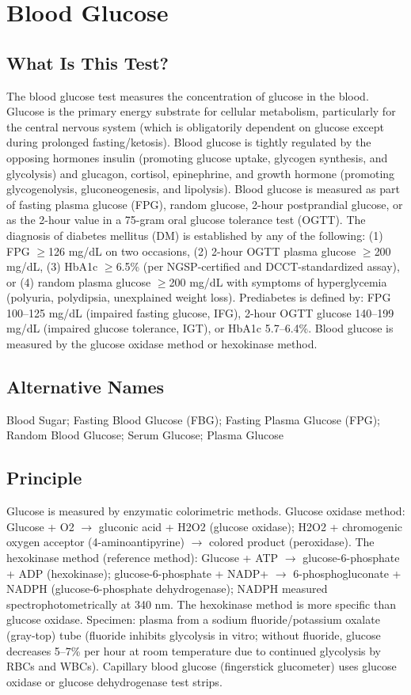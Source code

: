\chapter{Blood Glucose}
\section*{What Is This Test?}
The blood glucose test measures the concentration of glucose in the blood. Glucose is the primary energy substrate for cellular metabolism, particularly for the central nervous system (which is obligatorily dependent on glucose except during prolonged fasting/ketosis). Blood glucose is tightly regulated by the opposing hormones insulin (promoting glucose uptake, glycogen synthesis, and glycolysis) and glucagon, cortisol, epinephrine, and growth hormone (promoting glycogenolysis, gluconeogenesis, and lipolysis). Blood glucose is measured as part of fasting plasma glucose (FPG), random glucose, 2-hour postprandial glucose, or as the 2-hour value in a 75-gram oral glucose tolerance test (OGTT). The diagnosis of diabetes mellitus (DM) is established by any of the following: (1) FPG $\geq$126 mg/dL on two occasions, (2) 2-hour OGTT plasma glucose $\geq$200 mg/dL, (3) HbA1c $\geq$6.5\% (per NGSP-certified and DCCT-standardized assay), or (4) random plasma glucose $\geq$200 mg/dL with symptoms of hyperglycemia (polyuria, polydipsia, unexplained weight loss). Prediabetes is defined by: FPG 100--125 mg/dL (impaired fasting glucose, IFG), 2-hour OGTT glucose 140--199 mg/dL (impaired glucose tolerance, IGT), or HbA1c 5.7--6.4\%. Blood glucose is measured by the glucose oxidase method or hexokinase method.
\section*{Alternative Names}
Blood Sugar; Fasting Blood Glucose (FBG); Fasting Plasma Glucose (FPG); Random Blood Glucose; Serum Glucose; Plasma Glucose
\section*{Principle}
Glucose is measured by enzymatic colorimetric methods. Glucose oxidase method: Glucose + O2 $\rightarrow$ gluconic acid + H2O2 (glucose oxidase); H2O2 + chromogenic oxygen acceptor (4-aminoantipyrine) $\rightarrow$ colored product (peroxidase). The hexokinase method (reference method): Glucose + ATP $\rightarrow$ glucose-6-phosphate + ADP (hexokinase); glucose-6-phosphate + NADP+ $\rightarrow$ 6-phosphogluconate + NADPH (glucose-6-phosphate dehydrogenase); NADPH measured spectrophotometrically at 340 nm. The hexokinase method is more specific than glucose oxidase. Specimen: plasma from a sodium fluoride/potassium oxalate (gray-top) tube (fluoride inhibits glycolysis in vitro; without fluoride, glucose decreases 5--7\% per hour at room temperature due to continued glycolysis by RBCs and WBCs). Capillary blood glucose (fingerstick glucometer) uses glucose oxidase or glucose dehydrogenase test strips.
